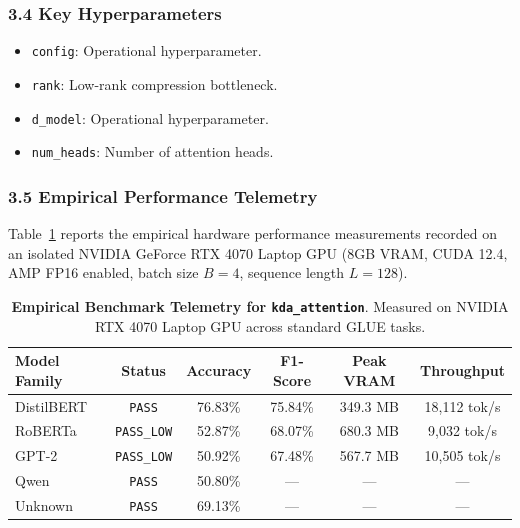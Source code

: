 \subsubsection*{3.4 Key Hyperparameters}
\begin{itemize}
    \item \texttt{config}: Operational hyperparameter.
    \item \texttt{rank}: Low-rank compression bottleneck.
    \item \texttt{d\_model}: Operational hyperparameter.
    \item \texttt{num\_heads}: Number of attention heads.
\end{itemize}

\subsubsection*{3.5 Empirical Performance Telemetry}
Table~\ref{tab:telemetry_kda_attention} reports the empirical hardware performance measurements recorded on an isolated NVIDIA GeForce RTX 4070 Laptop GPU (8GB VRAM, CUDA 12.4, AMP FP16 enabled, batch size $B=4$, sequence length $L=128$).

\begin{table}[h]
\centering
\small
\caption{\textbf{Empirical Benchmark Telemetry for \texttt{kda\_attention}}. Measured on NVIDIA RTX 4070 Laptop GPU across standard GLUE tasks.}
\label{tab:telemetry_kda_attention}
\begin{tabular*}{\columnwidth}{@{\extracolsep{\fill}}lccccc}
\toprule
\textbf{Model Family} & \textbf{Status} & \textbf{Accuracy} & \textbf{F1-Score} & \textbf{Peak VRAM} & \textbf{Throughput} \\
\midrule
DistilBERT & \texttt{PASS} & 76.83\% & 75.84\% & 349.3 MB & 18,112 tok/s \\
RoBERTa & \texttt{PASS\_LOW} & 52.87\% & 68.07\% & 680.3 MB & 9,032 tok/s \\
GPT-2 & \texttt{PASS\_LOW} & 50.92\% & 67.48\% & 567.7 MB & 10,505 tok/s \\
Qwen & \texttt{PASS} & 50.80\% & --- & --- & --- \\
Unknown & \texttt{PASS} & 69.13\% & --- & --- & --- \\
\bottomrule
\end{tabular*}
\end{table}

